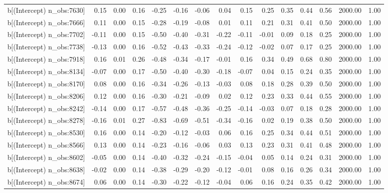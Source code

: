 \begin{table}[ht]
\begin{tabular}{rrrrrrrrrrrrrrr}
  b[(Intercept) n\_obs:7630] & 0.15 & 0.00 & 0.16 & -0.25 & -0.16 & -0.06 & 0.04 & 0.15 & 0.25 & 0.35 & 0.44 & 0.56 & 2000.00 & 1.00 \\ 
  b[(Intercept) n\_obs:7666] & 0.11 & 0.00 & 0.15 & -0.28 & -0.19 & -0.08 & 0.01 & 0.11 & 0.21 & 0.31 & 0.41 & 0.50 & 2000.00 & 1.00 \\ 
  b[(Intercept) n\_obs:7702] & -0.11 & 0.00 & 0.15 & -0.50 & -0.40 & -0.31 & -0.22 & -0.11 & -0.01 & 0.09 & 0.18 & 0.25 & 2000.00 & 1.00 \\ 
  b[(Intercept) n\_obs:7738] & -0.13 & 0.00 & 0.16 & -0.52 & -0.43 & -0.33 & -0.24 & -0.12 & -0.02 & 0.07 & 0.17 & 0.25 & 2000.00 & 1.00 \\ 
  b[(Intercept) n\_obs:7918] & 0.16 & 0.01 & 0.26 & -0.48 & -0.34 & -0.17 & -0.01 & 0.16 & 0.34 & 0.49 & 0.68 & 0.80 & 2000.00 & 1.00 \\ 
  b[(Intercept) n\_obs:8134] & -0.07 & 0.00 & 0.17 & -0.50 & -0.40 & -0.30 & -0.18 & -0.07 & 0.04 & 0.15 & 0.24 & 0.35 & 2000.00 & 1.00 \\ 
  b[(Intercept) n\_obs:8170] & 0.08 & 0.00 & 0.16 & -0.34 & -0.26 & -0.13 & -0.03 & 0.08 & 0.18 & 0.28 & 0.39 & 0.50 & 2000.00 & 1.00 \\ 
  b[(Intercept) n\_obs:8206] & 0.12 & 0.00 & 0.16 & -0.30 & -0.21 & -0.09 & 0.02 & 0.12 & 0.23 & 0.33 & 0.44 & 0.55 & 2000.00 & 1.00 \\ 
  b[(Intercept) n\_obs:8242] & -0.14 & 0.00 & 0.17 & -0.57 & -0.48 & -0.36 & -0.25 & -0.14 & -0.03 & 0.07 & 0.18 & 0.28 & 2000.00 & 1.00 \\ 
  b[(Intercept) n\_obs:8278] & -0.16 & 0.01 & 0.27 & -0.83 & -0.69 & -0.51 & -0.34 & -0.16 & 0.02 & 0.19 & 0.38 & 0.50 & 2000.00 & 1.00 \\ 
  b[(Intercept) n\_obs:8530] & 0.16 & 0.00 & 0.14 & -0.20 & -0.12 & -0.03 & 0.06 & 0.16 & 0.25 & 0.34 & 0.44 & 0.51 & 2000.00 & 1.00 \\ 
  b[(Intercept) n\_obs:8566] & 0.13 & 0.00 & 0.14 & -0.23 & -0.16 & -0.06 & 0.03 & 0.13 & 0.23 & 0.31 & 0.41 & 0.48 & 2000.00 & 1.00 \\ 
  b[(Intercept) n\_obs:8602] & -0.05 & 0.00 & 0.14 & -0.40 & -0.32 & -0.24 & -0.15 & -0.04 & 0.05 & 0.14 & 0.24 & 0.31 & 2000.00 & 1.00 \\ 
  b[(Intercept) n\_obs:8638] & -0.02 & 0.00 & 0.14 & -0.38 & -0.29 & -0.20 & -0.12 & -0.01 & 0.08 & 0.16 & 0.26 & 0.34 & 2000.00 & 1.00 \\ 
  b[(Intercept) n\_obs:8674] & 0.06 & 0.00 & 0.14 & -0.30 & -0.22 & -0.12 & -0.04 & 0.06 & 0.16 & 0.24 & 0.35 & 0.42 & 2000.00 & 1.00 \\ 

\end{tabular}
\end{table}

